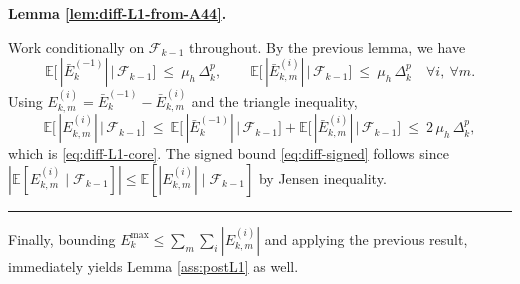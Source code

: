 \documentclass[11pt,a4paper]{article}
\newenvironment{proof}[1][Proof]{%
  \par\noindent\textbf{#1.}\ %
}{%
  \par\vspace{-0.5 ex}            %
  \noindent\hfill\rule{0.5em}{0.5em}\par
  \vspace{1ex}
}
\newcommand{\Dexp}{p}
\begin{document}
\begin{proof}[Lemma \ref{lem:diff-L1-from-A44}]
Work conditionally on $\mathcal F_{k-1}$ throughout. By the previous lemma, we have
\[
\mathbb E\big[\,|\bar E_{k}^{(-1)}|\,\big|\,\mathcal F_{k-1}\big]\ \le\ \mu_h\,\Delta_k^{\Dexp},
\qquad
\mathbb E\big[\,|\bar E_{k,m}^{(i)}|\,\big|\,\mathcal F_{k-1}\big]\ \le\ \mu_h\,\Delta_k^{\Dexp}
\quad \forall i,\ \forall m.
\]
Using $E_{k,m}^{(i)}=\bar E_{k}^{(-1)}-\bar E_{k,m}^{(i)}$ and the triangle inequality,
\[
\mathbb E\big[\,|E_{k,m}^{(i)}|\,\big|\,\mathcal F_{k-1}\big]
\ \le\ \mathbb E\big[\,|\bar E_{k}^{(-1)}|\,\big|\,\mathcal F_{k-1}\big]
      + \mathbb E\big[\,|\bar E_{k,m}^{(i)}|\,\big|\,\mathcal F_{k-1}\big]
\ \le\ 2\,\mu_h\,\Delta_k^{\Dexp},
\]
which is \eqref{eq:diff-L1-core}. The signed bound \eqref{eq:diff-signed} follows since
$|\mathbb E[E_{k,m}^{(i)}\mid\mathcal F_{k-1}]|\le \mathbb E[|E_{k,m}^{(i)}|\mid\mathcal F_{k-1}]$ by Jensen inequality.
\end{proof}
\noindent
Finally, bounding $E^{\max}_k \leq \sum_{m}\sum_{i}|E_{k,m}^{(i)}|$ and applying the previous result, immediately yields Lemma \ref{ass:postL1} as well.
\end{document}
